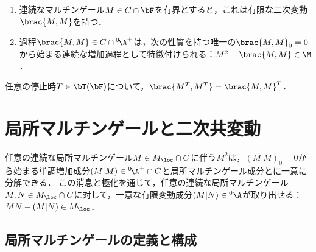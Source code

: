 \documentclass[uplatex,dvipdfmx]{jsreport}
\begin{document}
\begin{theorem}\mbox{}\label{thm-quadratic-variation-for-bounded-martingale}
    \begin{enumerate}
        \item 連続なマルチンゲール$M\in C\cap\bF$を有界とすると，これは有限な二次変動$\brac{M,M}$を持つ．
        \item 過程$\brac{M,M}\in C\cap{}^0\!\A^+$は，次の性質を持つ唯一の$\brac{M,M}_0=0$から始まる連続な増加過程として特徴付けられる：$M^2-\brac{M,M}\in\M$．
    \end{enumerate}
\end{theorem}

\begin{lemma}
    任意の停止時$T\in\bT(\bF)$について，$\brac{M^T,M^T}=\brac{M,M}^T$．
\end{lemma}

\section{局所マルチンゲールと二次共変動}

\begin{tcolorbox}[colframe=ForestGreen, colback=ForestGreen!10!white,breakable,colbacktitle=ForestGreen!40!white,coltitle=black,fonttitle=\bfseries\sffamily,
title=]
    任意の連続な局所マルチンゲール$M\in M_\loc\cap C$に伴う$M^2$は，$(M|M)_0=0$から始まる単調増加成分$(M|M)\in {}^0\!\A^+\cap C$と局所マルチンゲール成分とに一意に分解できる．
    この消息と極化を通じて，任意の連続な局所マルチンゲール$M,N\in M_\loc\cap C$に対して，一意な有限変動成分$(M|N)\in{}^0\A$が取り出せる：$MN-(M|N)\in M_\loc$．
\end{tcolorbox}

\subsection{局所マルチンゲールの定義と構成}
\end{document}

